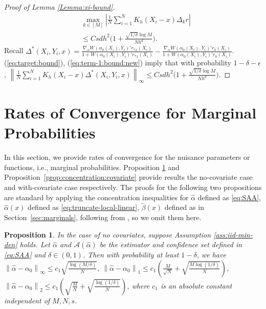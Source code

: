 \documentclass[11pt]{article}
\newtheorem{proposition}{Proposition}
\newcommand{\norm}[1]{\left\lVert #1 \right\rVert}
\begin{document}
\begin{proof}[Proof of Lemma \ref{Lemma:xi-bound}]
\begin{equation}\label{eq:term-1:bound:new}
\begin{array}{rl}
&\displaystyle\max_{k\in[M]}\left|\frac{1}{N}\sum_{i=1}^NK_h(X_i-x)\Delta_kr\right|\\
&\displaystyle\leq Csdh^2\bigg(1 \!+\!\frac{\sqrt{1/\delta}\log M}{Nh^d}\!\bigg). 
\end{array}
\end{equation}
Recall $\displaystyle\Delta^{*}(X_i,Y_i,x)=\frac{ \nabla_\alpha W(\alpha_0(X_i),Y_i)'r_{*x}(X_i)}{1+W(\alpha_0(X_i),Y_i)'r_{*x}(X_i)} - \frac{ \nabla_\alpha W(\alpha_0(X_i),Y_i)'r_0(X_i)}{1+W(\alpha_0(X_i),Y_i)'r_0(X_i)}$.  (\ref{eq:target:bound}), (\ref{eq:term-1:bound:new}) imply that with probability $1-\delta-\epsilon$, $\displaystyle\left\|\frac{1}{N}\sum_{i=1}^NK_h(X_i-x)\Delta^{*}(X_i,Y_i,x)\right\|_\infty\!\!\!\!\!\leq Csdh^2\bigg(1 \!+\!\frac{\sqrt{1/\delta}\log M}{Nh^d}\!\bigg)$.
\end{proof}

\section{Rates of Convergence for Marginal Probabilities}\label{appendix:marginal}
In this section, we provide rates of convergence for the nuisance parameters or functions, i.e., marginal probabilities. Proposition \ref{prop:concentration:no covariate} and Proposition~\ref{prop:concentration:covariate} provide results the no-covariate case and with-covariate case respectively. The proofs for the following two propositions are standard by applying the concentration inequalities for $\hat{\alpha}$ defined as \eqref{eq:SAA}, $\hat{\alpha}(x)$ defined as \eqref{eq:truncate-local-linear}, $\tilde\beta(x)$ defined as in Section~\ref{sec:marginals}, following from \citep{boucheron2003concentration,einmahl2005uniform,hansen2008uniform,fan1993local}, so we omit them here. 
\begin{proposition}\label{prop:concentration:no covariate} In the case of no covariates, suppose Assumption \ref{ass:iid-min-den} holds. Let $\hat{\alpha}$ and $\mathcal{A}(\hat\alpha)$ be the estimator and confidence set defined in \eqref{eq:SAA} and $\delta \in (0,1)$. Then with probability at least $1-\delta$, we have $\norm{\hat{\alpha}-\alpha_0}_{\infty}\leq c_1\sqrt{\frac{\log(M/\delta)}{N}}$, $\norm{\hat\alpha-\alpha_0}_1\leq 
c_1\left(\frac{M}{\sqrt{N}}+\sqrt{\frac{M\log(1/\delta)}{N}}\right)$, $\norm{\hat\alpha-\alpha_0}_2\leq 
c_1\left(\sqrt{\frac{M}{N}}+\sqrt{\frac{\log(1/\delta)}{N}}\right)$, 
where $c_1$ is an absolute constant independent of $M,N,s$. 
\end{proposition}
\end{document}
